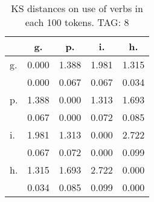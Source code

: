 \begin{table}[h!]
\begin{center}
\begin{tabular}{| l | c | c | c | c |}\hline
 & g. & p. & i. & h. \\\hline
g. & 0.000  & 1.388  & 1.981  & 1.315 \\\hline
 & 0.000  & 0.067  & 0.067  & 0.034 \\\hline
p. & 1.388  & 0.000  & 1.313  & 1.693 \\\hline
 & 0.067  & 0.000  & 0.072  & 0.085 \\\hline
i. & 1.981  & 1.313  & 0.000  & 2.722 \\\hline
 & 0.067  & 0.072  & 0.000  & 0.099 \\\hline
h. & 1.315  & 1.693  & 2.722  & 0.000 \\\hline
 & 0.034  & 0.085  & 0.099  & 0.000 \\\hline
\end{tabular}
\caption{KS distances on use of verbs in each 100 tokens. TAG: 8}
\end{center}
\end{table}